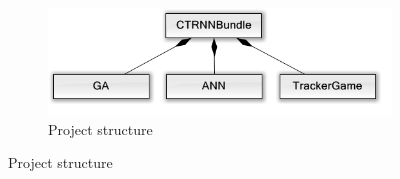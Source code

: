 \documentclass[10pt]{article}
\begin{document}
\begin{figure}
\begin{subfigure}{.3\textwidth}
			\label{fig:trackergamestruct}
		\end{subfigure}
		\begin{subfigure}{.3\textwidth}
			\centering
			\includegraphics[width=\linewidth]{./../images/Structure.png}
			\caption{Project structure}
			\label{fig:struct}
		\end{subfigure}
	\end{figure}
\end{document}
